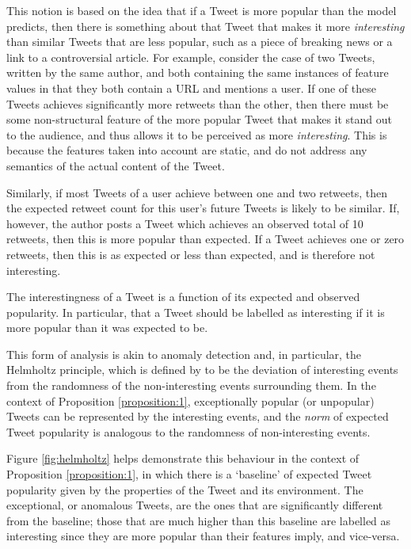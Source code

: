This notion is based on the idea that if a Tweet is more popular than the model predicts, then there is something about that Tweet that makes it more \textit{interesting} than similar Tweets that are less popular, such as a piece of breaking news or a link to a controversial article. For example, consider the case of two Tweets, written by the same author, and both containing the same instances of feature values in that they both contain a URL and mentions a user. If one of these Tweets achieves significantly more retweets than the other, then there must be some non-structural feature of the more popular Tweet that makes it stand out to the audience, and thus allows it to be perceived as more \textit{interesting}. This is because the features taken into account are static, and do not address any semantics of the actual content of the Tweet.

Similarly, if most Tweets of a user achieve between one and two retweets, then the expected retweet count for this user's future Tweets is likely to be similar. If, however, the author posts a Tweet which achieves an observed total of 10 retweets, then this is more popular than expected. If a Tweet achieves one or zero retweets, then this is as expected or less than expected, and is therefore not interesting.

\begin{myproposition}
\label{proposition:1}
The interestingness of a Tweet is a function of its expected and observed popularity. In particular, that a Tweet should be labelled as interesting if it is more popular than it was expected to be.
\end{myproposition}

This form of analysis is akin to anomaly detection and, in particular, the Helmholtz principle, which is defined by \cite{balinsky11} to be the deviation of interesting events from the randomness of the non-interesting events surrounding them. In the context of Proposition \ref{proposition:1}, exceptionally popular (or unpopular) Tweets can be represented by the interesting events, and the \textit{norm} of expected Tweet popularity is analogous to the randomness of non-interesting events.

Figure \ref{fig:helmholtz} helps demonstrate this behaviour in the context of Proposition \ref{proposition:1}, in which there is a `baseline' of expected Tweet popularity given by the properties of the Tweet and its environment. The exceptional, or anomalous Tweets, are the ones that are significantly different from the baseline; those that are much higher than this baseline are labelled as interesting since they are more popular than their features imply, and vice-versa.

